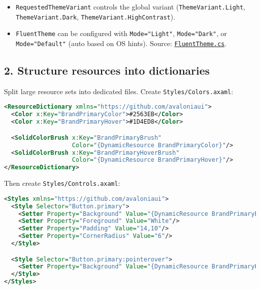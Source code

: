 \begin{itemize}
\tightlist
\item
  \passthrough{\lstinline!RequestedThemeVariant!} controls the global
  variant (\passthrough{\lstinline!ThemeVariant.Light!},
  \passthrough{\lstinline!ThemeVariant.Dark!},
  \passthrough{\lstinline!ThemeVariant.HighContrast!}).
\item
  \passthrough{\lstinline!FluentTheme!} can be configured with
  \passthrough{\lstinline!Mode="Light"!},
  \passthrough{\lstinline!Mode="Dark"!}, or
  \passthrough{\lstinline!Mode="Default"!} (auto based on OS hints).
  Source:
  \href{https://github.com/AvaloniaUI/Avalonia/blob/master/src/Avalonia.Themes.Fluent/FluentTheme.cs}{\passthrough{\lstinline!FluentTheme.cs!}}.
\end{itemize}

\subsection{2. Structure resources into
dictionaries}\label{structure-resources-into-dictionaries}

Split large resource sets into dedicated files. Create
\passthrough{\lstinline!Styles/Colors.axaml!}:

\begin{lstlisting}[language=XML]
<ResourceDictionary xmlns="https://github.com/avaloniaui">
  <Color x:Key="BrandPrimaryColor">#2563EB</Color>
  <Color x:Key="BrandPrimaryHover">#1D4ED8</Color>

  <SolidColorBrush x:Key="BrandPrimaryBrush"
                   Color="{DynamicResource BrandPrimaryColor}"/>
  <SolidColorBrush x:Key="BrandPrimaryHoverBrush"
                   Color="{DynamicResource BrandPrimaryHover}"/>
</ResourceDictionary>
\end{lstlisting}

Then create \passthrough{\lstinline!Styles/Controls.axaml!}:

\begin{lstlisting}[language=XML]
<Styles xmlns="https://github.com/avaloniaui">
  <Style Selector="Button.primary">
    <Setter Property="Background" Value="{DynamicResource BrandPrimaryBrush}"/>
    <Setter Property="Foreground" Value="White"/>
    <Setter Property="Padding" Value="14,10"/>
    <Setter Property="CornerRadius" Value="6"/>
  </Style>

  <Style Selector="Button.primary:pointerover">
    <Setter Property="Background" Value="{DynamicResource BrandPrimaryHoverBrush}"/>
  </Style>
</Styles>
\end{lstlisting}

